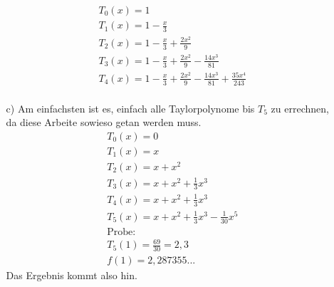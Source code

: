 \documentclass[a4paper,11pt]{article}
\begin{document}
\begin{enumerate}
\begin{enumerate}
\begin{align*}
                        &T_0(x)= 1\\
                        &T_1(x)= 1- \frac{x}{3}\\
                        &T_2(x)= 1- \frac{x}{3}+ \frac{2x^2}{9}\\
                        &T_3(x)= 1- \frac{x}{3}+ \frac{2x^2}{9} - \frac{14x^3}{81}\\
                        &T_4(x)= 1- \frac{x}{3}+ \frac{2x^2}{9} - \frac{14x^3}{81} + \frac{35x^4}{243}\\
                    \end{align*}
                \item[c)]
                    Am einfachsten ist es, einfach alle Taylorpolynome bis $T_5$ zu errechnen, da diese Arbeite sowieso
                    getan werden muss.
                    \begin{align*}
                        &T_0(x) = 0\\
                        &T_1(x) = x\\
                        &T_2(x) = x+x^2\\
                        &T_3(x) = x+x^2+ \frac{1}{3}x^3\\
                        &T_4(x) = x+x^2+ \frac{1}{3}x^3\\
                        &T_5(x) = x+x^2+ \frac{1}{3}x^3 - \frac{1}{30}x^5\\
                        &\text{Probe:}\\
                        &T_5(1) = \frac{69}{30}=2,3\\
                        &f(1) = 2,287355...
                    \end{align*}
                    Das Ergebnis kommt also hin.
            \end{enumerate}
              

\end{enumerate}
\end{document}
